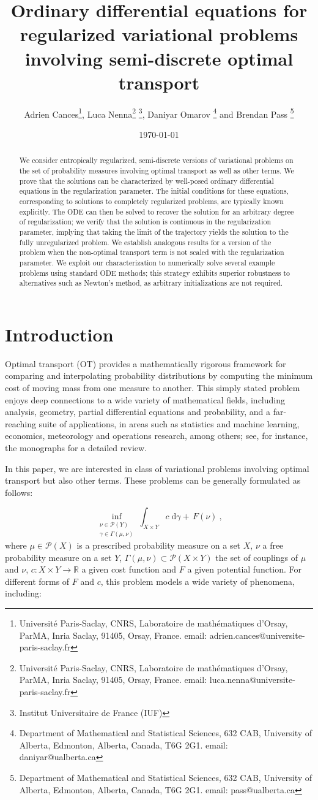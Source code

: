 \documentclass{scrartcl}
\title{Ordinary differential equations for regularized variational problems involving semi-discrete optimal transport }
\author{
Adrien Cances\thanks{Universit\'e Paris-Saclay, CNRS, Laboratoire de math\'ematiques d'Orsay, ParMA, Inria Saclay, 91405, Orsay, France. 
email: adrien.cances@universite-paris-saclay.fr},\;
Luca Nenna\thanks{Universit\'e Paris-Saclay, CNRS, Laboratoire de math\'ematiques d'Orsay, ParMA, Inria Saclay, 91405, Orsay, France. 
email: luca.nenna@universite-paris-saclay.fr} \thanks{Institut Universitaire de France (IUF)},\;
Daniyar Omarov \thanks{Department of Mathematical and Statistical Sciences, 632 CAB, University of Alberta, Edmonton, Alberta, Canada, T6G 2G1.
email: daniyar@ualberta.ca}
  and  Brendan Pass \thanks{Department of Mathematical and Statistical Sciences, 632 CAB, University of Alberta, Edmonton, Alberta, Canada, T6G 2G1.
email: pass@ualberta.ca}}
\date{\today}
\theoremstyle{plain}
\theoremstyle{definition}
\begin{document}
\maketitle

\begin{abstract}
We consider entropically regularized, semi-discrete versions of variational problems on the set of probability measures involving optimal transport as well as other terms.  We prove that the solutions can be characterized by well-posed ordinary differential equations in the regularization parameter.  The initial conditions for these equations, corresponding to solutions to completely regularized problems, are typically known explicitly.  The ODE can then be solved to recover the solution for an arbitrary degree of regularization; we verify that the solution is continuous in the regularization parameter, implying that taking the limit of the trajectory yields the solution to the fully unregularized problem. We establish analogous results for a version of the problem when the non-optimal transport term is not scaled with the regularization parameter.  We exploit our characterization to numerically solve several example problems using standard ODE methods; this strategy exhibits superior robustness to alternatives such as Newton's method, as arbitrary initializations are not required.
\end{abstract}
\section{Introduction}\label{sec:intro}

Optimal transport (OT) provides a mathematically rigorous framework for comparing and interpolating probability distributions by computing the minimum cost of moving mass from one measure to another.  This simply stated problem enjoys deep connections to a wide variety of mathematical fields, including analysis, geometry, partial differential equations and probability, and a far-reaching suite of applications, in areas such as statistics and machine learning, economics, meteorology and operations research, among others; see, for instance, the monographs  \cite{villani2009optimal,ambrosio2008gradient, Santambrogio2015} for a detailed review.

In this paper, we are interested in class of variational problems involving optimal transport but also other terms.  These problems can be generally formulated as follows:

\begin{equation}\label{eqn: general variational problems}
  \inf_{\substack{\nu\in\mathcal{P}(Y)\\
  \gamma\in\Gamma(\mu,\nu)}}
  \int_{X\times Y} c\;\mathrm{d}\gamma  
  + \,F(\nu)\ ,
\end{equation}
where $\mu \in \mathcal{P}(X)$ is a prescribed probability measure on a set $X$, $\nu$ a free probability measure on a set $Y$, $\Gamma(\mu,\nu) \subset \mathcal{P}(X \times Y)$ the set of couplings of $\mu$ and $\nu$, $c: X \times Y \rightarrow \mathbb{R}$ a given cost function and $F$ a given potential function.  For different forms of $F$ and $c$, this problem models a wide variety of phenomena, including:
\end{document}
